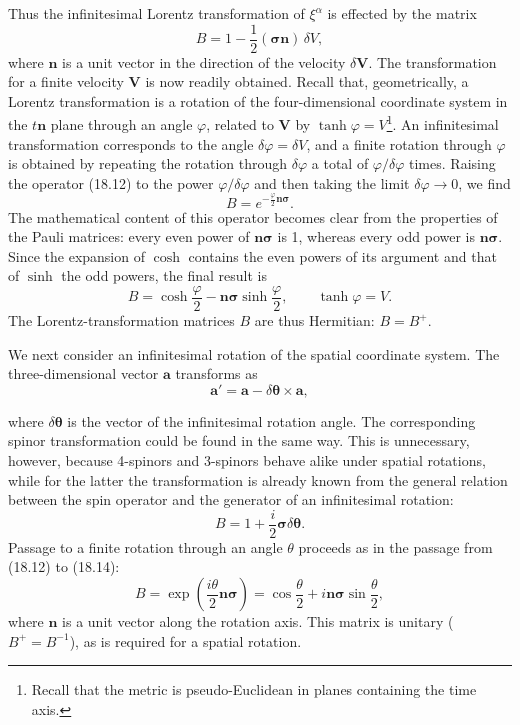Thus the infinitesimal Lorentz transformation of $\xi^\alpha$ is effected by the matrix
\begin{equation}
B=1-\frac12(\boldsymbol\sigma\mathbf n)\,\delta V,
\tag{18.12}
\end{equation}
where $\mathbf n$ is a unit vector in the direction of the velocity $\delta\mathbf V$. The transformation for a finite velocity $\mathbf V$ is now readily obtained. Recall that, geometrically, a Lorentz transformation is a rotation of the four-dimensional coordinate system in the $t\mathbf n$ plane through an angle $\varphi$, related to $\mathbf V$ by $\tanh\varphi=V$\footnote{Recall that the metric is pseudo-Euclidean in planes containing the time axis.}. An infinitesimal transformation corresponds to the angle $\delta\varphi=\delta V$, and a finite rotation through $\varphi$ is obtained by repeating the rotation through $\delta\varphi$ a total of $\varphi/\delta\varphi$ times. Raising the operator (18.12) to the power $\varphi/\delta\varphi$ and then taking the limit $\delta\varphi\to0$, we find
\begin{equation}
B=e^{-\frac{\varphi}{2}\mathbf n\boldsymbol\sigma}.
\tag{18.13}
\end{equation}
The mathematical content of this operator becomes clear from the properties of the Pauli matrices: every even power of $\mathbf n\boldsymbol\sigma$ is 1, whereas every odd power is $\mathbf n\boldsymbol\sigma$. Since the expansion of $\cosh$ contains the even powers of its argument and that of $\sinh$ the odd powers, the final result is
\begin{equation}
B=\cosh\frac{\varphi}{2}
-\mathbf n\boldsymbol\sigma\sinh\frac{\varphi}{2},
\qquad
\tanh\varphi=V.
\tag{18.14}
\end{equation}
The Lorentz-transformation matrices $B$ are thus Hermitian: $B=B^+$.

We next consider an infinitesimal rotation of the spatial coordinate system. The three-dimensional vector $\mathbf a$ transforms as
\begin{equation}
\mathbf a'=\mathbf a-\delta\boldsymbol\theta\times\mathbf a,
\tag{18.15}
\end{equation}

where $\delta\boldsymbol\theta$ is the vector of the infinitesimal rotation angle. The corresponding spinor transformation could be found in the same way. This is unnecessary, however, because 4-spinors and 3-spinors behave alike under spatial rotations, while for the latter the transformation is already known from the general relation between the spin operator and the generator of an infinitesimal rotation:
\begin{equation}
B=1+\frac{i}{2}\boldsymbol\sigma\delta\boldsymbol\theta.
\tag{18.16}
\end{equation}
Passage to a finite rotation through an angle $\theta$ proceeds as in the passage from (18.12) to (18.14):
\begin{equation}
B=\exp\left(\frac{i\theta}{2}\mathbf n\boldsymbol\sigma\right)
=\cos\frac{\theta}{2}+i\mathbf n\boldsymbol\sigma\sin\frac{\theta}{2},
\tag{18.17}
\end{equation}
where $\mathbf n$ is a unit vector along the rotation axis. This matrix is unitary ($B^+=B^{-1}$), as is required for a spatial rotation.
